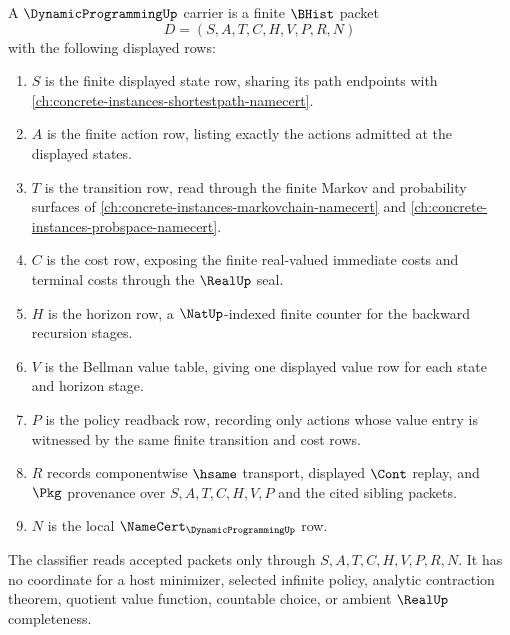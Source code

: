 \begin{definition}
\label{def:dynamic-programming-carrier}
A $\DynamicProgrammingUp$ carrier is a finite $\BHist$ packet
$$
D=(S,A,T,C,H,V,P,R,N)
$$
with the following displayed rows:
\begin{enumerate}
\item $S$ is the finite displayed state row, sharing its path endpoints with \autoref{ch:concrete-instances-shortestpath-namecert}.
\item $A$ is the finite action row, listing exactly the actions admitted at the displayed states.
\item $T$ is the transition row, read through the finite Markov and probability surfaces of \autoref{ch:concrete-instances-markovchain-namecert} and \autoref{ch:concrete-instances-probspace-namecert}.
\item $C$ is the cost row, exposing the finite real-valued immediate costs and terminal costs through the $\RealUp$ seal.
\item $H$ is the horizon row, a $\NatUp$-indexed finite counter for the backward recursion stages.
\item $V$ is the Bellman value table, giving one displayed value row for each state and horizon stage.
\item $P$ is the policy readback row, recording only actions whose value entry is witnessed by the same finite transition and cost rows.
\item $R$ records componentwise $\hsame$ transport, displayed $\Cont$ replay, and $\Pkg$ provenance over $S,A,T,C,H,V,P$ and the cited sibling packets.
\item $N$ is the local $\NameCert_{\DynamicProgrammingUp}$ row.
\end{enumerate}
The classifier reads accepted packets only through $S,A,T,C,H,V,P,R,N$. It has no coordinate for a host minimizer, selected infinite policy, analytic contraction theorem, quotient value function, countable choice, or ambient $\RealUp$ completeness.
\end{definition}


